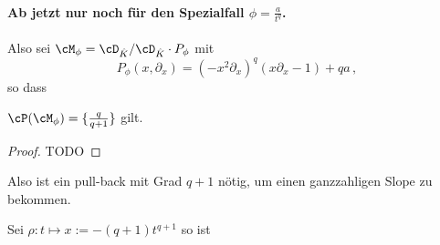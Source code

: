 \paragraph{Ab jetzt nur noch für den Spezialfall $\phi=\frac{a}{t^{q}}$.}
Also sei $\cM_\phi=\cD_{\hat K}/\cD_{\hat K}\cdot P_\phi$ mit
\[
P_{\phi}(x,\partial_x) =(-x^2\partial_x)^{q} (x\partial_x-1)+qa \,,
\]
so dass
\begin{lem}
$\cP(\cM_{\phi})=\{\frac{q}{q+1}\}$ gilt.
\end{lem}
\begin{proof} \cite[5.b.]{sabbah_Fourier-local}
TODO
\begin{comment}
über L-Symbol? Stützfunktion? Versuch:\\
Mit $L=q s_0 + (q+1)s_2$ gilt
\[
\sigma_L(P)= \pm x^{2q+1}\partial_x^{q+1} + qa \,,
\]
welches aus mehr als einem Monom besteht, deshalb ist der zu $L$ zugehörige
Slope $\frac{q}{q+1}$ ein Slope von $P$. Da $q+1$ die höchste vorkommende
$\partial_x$-Potez ist, kann es auch keinen weiteren Slope geben.
\end{comment}
\end{proof}
Also ist ein pull-back mit Grad $q+1$ nötig, um einen ganzzahligen Slope zu
bekommen.
\begin{comment}
Sei $\rho:t\mapsto x:=t^{q+1}$ so ist
\begin{align*}
\rho^+\cM_\phi &= \rho^+(\cD_{\hat K}/\cD_{\hat K}\cdot P_\phi(x,\partial_x))\\
  &=\cD_{\hat K}/\cD_{\hat K}\cdot(\rho^*P_\phi(x,\partial_x))\\
  &=\cD_{\hat K}/\cD_{\hat K}\cdot(P_\phi(\rho(t),\rho'(t)^{-1}\partial_t))\\
  &=\cD_{\hat K}/\cD_{\hat K}
    \cdot(P_\phi(t^{q+1},\frac{1}{(q+1)t^q}\partial_t))\\
  &=\cD_{\hat K}/\cD_{\hat K}
    \cdot((-(t^{q+1})^2\frac{1}{(q+1)t^{q}}\partial_t)^{q}
    (t^{q+1}\frac{1}{(q+1)t^{q}}\partial_t-1)+qa)\\
  &=\cD_{\hat K}/\cD_{\hat K}
    \cdot((-\frac{1}{q+1}t^{2(q+1)-q}\partial_t)^{q}
    (\frac{1}{q+1}t\partial_t-1)+qa)\\
  &=\cD_{\hat K}/\cD_{\hat K}
    \cdot((-\frac{1}{q+1}t^{q+2}\partial_t)^{q}
    (\frac{1}{q+1}t\partial_t-1)+qa)
\end{align*}
\end{comment}
Sei $\rho:t\mapsto x:=-(q+1) t^{q+1}$ so ist
